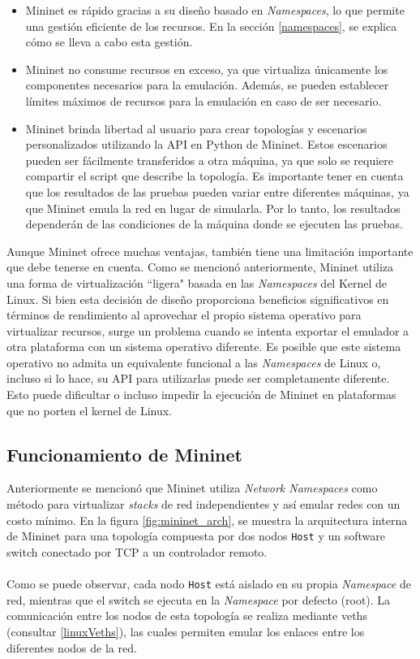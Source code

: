 \begin{itemize}
    \item Mininet es rápido gracias a su diseño basado en \textit{Namespaces}, lo que permite una gestión eficiente de los recursos. En la sección \ref{namespaces}, se explica cómo se lleva a cabo esta gestión.
    \item Mininet no consume recursos en exceso, ya que virtualiza únicamente los componentes necesarios para la emulación. Además, se pueden establecer límites máximos de recursos para la emulación en caso de ser necesario.
    \item Mininet brinda libertad al usuario para crear topologías y escenarios personalizados utilizando la API en Python de Mininet. Estos escenarios pueden ser fácilmente transferidos a otra máquina, ya que solo se requiere compartir el script que describe la topología. Es importante tener en cuenta que los resultados de las pruebas pueden variar entre diferentes máquinas, ya que Mininet emula la red en lugar de simularla. Por lo tanto, los resultados dependerán de las condiciones de la máquina donde se ejecuten las pruebas.
\end{itemize}

Aunque Mininet ofrece muchas ventajas, también tiene una limitación importante que debe tenerse en cuenta. Como se mencionó anteriormente, Mininet utiliza una forma de virtualización ``ligera" basada en las \textit{Namespaces} del Kernel de Linux. Si bien esta decisión de diseño proporciona beneficios significativos en términos de rendimiento al aprovechar el propio sistema operativo para virtualizar recursos, surge un problema cuando se intenta exportar el emulador a otra plataforma con un sistema operativo diferente. Es posible que este sistema operativo no admita un equivalente funcional a las \textit{Namespaces} de Linux o, incluso si lo hace, su API para utilizarlas puede ser completamente diferente. Esto puede dificultar o incluso impedir la ejecución de Mininet en plataformas que no porten el kernel de Linux.


\subsection{Funcionamiento de Mininet}

Anteriormente se mencionó que Mininet utiliza \textit{Network Namespaces} como método para virtualizar \textit{stacks} de red independientes y así emular redes con un costo mínimo. En la figura \ref{fig:mininet_arch}, se muestra la arquitectura interna de Mininet para una topología compuesta por dos nodos \texttt{Host} y un software switch conectado por TCP a un controlador remoto.\\
\\
Como se puede observar, cada nodo \texttt{Host} está aislado en su propia \textit{Namespace} de red, mientras que el switch se ejecuta en la \textit{Namespace} por defecto (root). La comunicación entre los nodos de esta topología se realiza mediante \gls{veth}s (consultar \ref{linuxVeths}), las cuales permiten emular los enlaces entre los diferentes nodos de la red.\\

